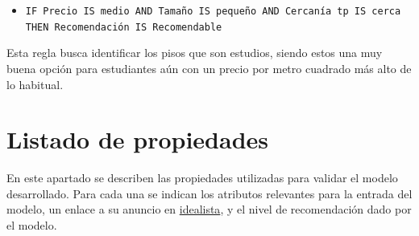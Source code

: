 \documentclass[12pt]{report} %
\begin{document}
    \begin{itemize}
        \item \texttt{IF Precio IS medio AND Tamaño IS pequeño AND Cercanía tp IS cerca THEN Recomendación IS Recomendable}
    \end{itemize}

    Esta regla busca identificar los pisos que son estudios, siendo estos una muy buena opción 
    para estudiantes aún con un precio por metro cuadrado más alto de lo habitual. 

    \chapter{Listado de propiedades}
    \label{chap:propiedades}
    En este apartado se describen las propiedades utilizadas para validar el
    modelo desarrollado. Para cada una se indican los atributos relevantes para
    la entrada del modelo, un enlace a su anuncio en
    \href{https://www.idealista.com}{idealista}, y el nivel de recomendación
    dado por el modelo.
\end{document}
